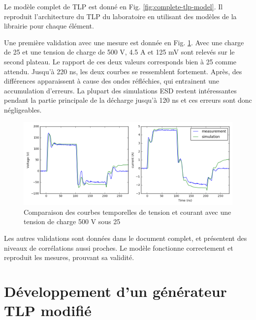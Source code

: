 Le modèle complet de TLP est donné en Fig. \ref{fig:complete-tlp-model}.
Il reproduit l'architecture du TLP du laboratoire en utilisant des modèles de la librairie pour chaque élément.

Une première validation avec une mesure est donnée en Fig. \ref{fig:comparison-tlp-load}.
Avec une charge de 25\textOmega{} et une tension de charge de 500 V, 4.5 A et 125 mV sont relevés sur le second plateau.
Le rapport de ces deux valeurs corresponds bien à 25\textOmega{} comme attendu.
Jusqu'à 220 ns, les deux courbes se ressemblent fortement.
Après, des différences apparaissent à cause des ondes réfléchies, qui entrainent une accumulation d'erreurs.
La plupart des simulations ESD restent intéressantes pendant la partie principale de la décharge jusqu'à 120 ns et ces erreurs sont donc négligeables.

\begin{figure}[!h]
  \centering
  \includegraphics[width=\textwidth]{src/1/figures/tlp_comparison_R25_500V.png}
  \caption{Comparaison des courbes temporelles de tension et courant avec une  tension de charge 500 V sous 25\textOmega{}}
  \label{fig:comparison-tlp-load}
\end{figure}

Les autres validations sont données dans le document complet, et présentent des niveaux de corrélations aussi proches.
Le modèle fonctionne correctement et reproduit les mesures, prouvant sa validité.

\section{Développement d'un générateur TLP modifié}

